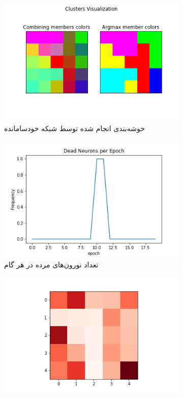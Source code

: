 \documentclass[12pt, a4paper]{article}
\begin{document}
\begin{figure}[h]
    \begin{subfigure}{\linewidth}
        \centering
        \includegraphics[width=0.8\linewidth]{images/q5/r1/cluster.png}
        \caption{خوشه‌بندی انجام شده توسط شبکه خودسامانده}
    \end{subfigure}
    \newline
    \begin{subfigure}{0.45\linewidth}
        \includegraphics[width=\linewidth]{images/q5/r1/dead.png}
        \caption{تعداد نورون‌های مرده در هر گام}
    \end{subfigure}
    \hfill
    \begin{subfigure}{0.45\linewidth}
        \includegraphics[width=\linewidth]{images/q5/r1/umatrix.png}

\end{subfigure}
\end{figure}
\end{document}
